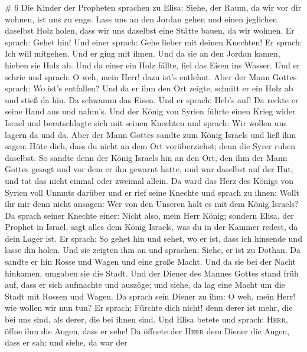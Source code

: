 \# 6  Die Kinder der Propheten sprachen zu Elisa: Siehe,
der Raum, da wir vor dir wohnen, ist uns zu enge.  Lass
uns an den Jordan gehen und einen jeglichen daselbst Holz holen, dass
wir uns daselbst eine Stätte bauen, da wir wohnen. Er sprach: Gehet hin!
 Und einer sprach: Gehe lieber mit deinen Knechten! Er
sprach: Ich will mitgehen.  Und er ging mit ihnen. Und da
sie an den Jordan kamen, hieben sie Holz ab.  Und da einer
ein Holz fällte, fiel das Eisen ins Wasser. Und er schrie und sprach: O
weh, mein Herr! dazu ist's entlehnt.  Aber der Mann Gottes
sprach: Wo ist's entfallen? Und da er ihm den Ort zeigte, schnitt er ein
Holz ab und stieß da hin. Da schwamm das Eisen.  Und er
sprach: Heb's auf! Da reckte er seine Hand aus und nahm's.
 Und der König von Syrien führte einen Krieg wider Israel
und beratschlagte sich mit seinen Knechten und sprach: Wir wollen uns
lagern da und da.  Aber der Mann Gottes sandte zum König
Israels und ließ ihm sagen: Hüte dich, dass du nicht an dem Ort
vorüberziehst; denn die Syrer ruhen daselbst.  So sandte
denn der König Israels hin an den Ort, den ihm der Mann Gottes gesagt
und vor dem er ihn gewarnt hatte, und war daselbst auf der Hut; und tat
das nicht einmal oder zweimal allein.  Da ward das Herz
des Königs von Syrien voll Unmuts darüber und er rief seine Knechte und
sprach zu ihnen: Wollt ihr mir denn nicht ansagen: Wer von den Unseren
hält es mit dem König Israels?  Da sprach seiner Knechte
einer: Nicht also, mein Herr König; sondern Elisa, der Prophet in
Israel, sagt alles dem König Israels, was du in der Kammer redest, da
dein Lager ist.  Er sprach: So gehet hin und sehet, wo er
ist, dass ich hinsende und lasse ihn holen. Und sie zeigten ihm an und
sprachen: Siehe, er ist zu Dothan.  Da sandte er hin
Rosse und Wagen und eine große Macht. Und da sie bei der Nacht hinkamen,
umgaben sie die Stadt.  Und der Diener des Mannes Gottes
stand früh auf, dass er sich aufmachte und auszöge; und siehe, da lag
eine Macht um die Stadt mit Rossen und Wagen. Da sprach sein Diener zu
ihm: O weh, mein Herr! wie wollen wir nun tun?  Er
sprach: Fürchte dich nicht! denn derer ist mehr, die bei uns sind, als
derer, die bei ihnen sind.  Und Elisa betete und sprach:
\textsc{Herr}, öffne ihm die Augen, dass er sehe! Da öffnete der
\textsc{Herr} dem Diener die Augen, dass er sah; und siehe, da war der
